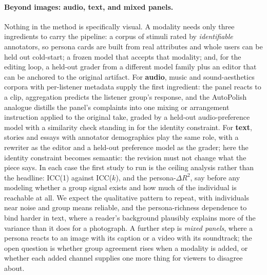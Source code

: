 \documentclass[10pt,twocolumn,letterpaper]{article}
\begin{document}
\paragraph{Beyond images: audio, text, and mixed panels.} Nothing in the method is specifically visual. A modality needs only three ingredients to carry the pipeline: a corpus of stimuli rated by \emph{identifiable} annotators, so persona cards are built from real attributes and whole users can be held out cold-start; a frozen model that accepts that modality; and, for the editing loop, a held-out grader from a different model family plus an editor that can be anchored to the original artifact. For \textbf{audio}, music and sound-aesthetics corpora with per-listener metadata supply the first ingredient: the panel reacts to a clip, aggregation predicts the listener group's response, and the AutoPolish analogue distills the panel's complaints into one mixing or arrangement instruction applied to the original take, graded by a held-out audio-preference model with a similarity check standing in for the identity constraint. For \textbf{text}, stories and essays with annotator demographics play the same role, with a rewriter as the editor and a held-out preference model as the grader; here the identity constraint becomes semantic: the revision must not change what the piece says. In each case the first study to run is the ceiling analysis rather than the headline: ICC(1) against ICC($k$), and the persona-$\Delta R^2$, say before any modeling whether a group signal exists and how much of the individual is reachable at all. We expect the qualitative pattern to repeat, with individuals near noise and group means reliable, and the persona-richness dependence to bind harder in text, where a reader's background plausibly explains more of the variance than it does for a photograph. A further step is \emph{mixed panels}, where a persona reacts to an image with its caption or a video with its soundtrack; the open question is whether group agreement rises when a modality is added, or whether each added channel supplies one more thing for viewers to disagree about.
\end{document}

